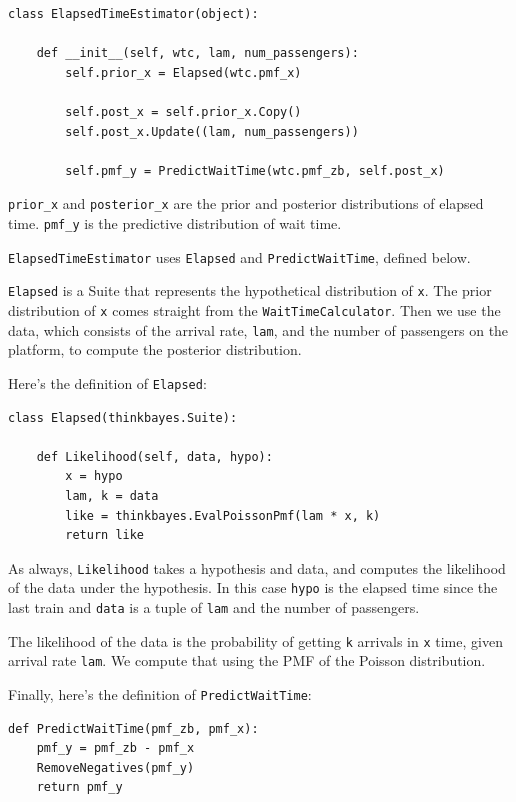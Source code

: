 \documentclass[12pt]{book}
\begin{document}
\begin{verbatim}
class ElapsedTimeEstimator(object):

    def __init__(self, wtc, lam, num_passengers):
        self.prior_x = Elapsed(wtc.pmf_x)

        self.post_x = self.prior_x.Copy()
        self.post_x.Update((lam, num_passengers))

        self.pmf_y = PredictWaitTime(wtc.pmf_zb, self.post_x)
\end{verbatim}

\verb"prior_x" and \verb"posterior_x" are the prior and
posterior distributions of elapsed time.  \verb"pmf_y" is
the predictive distribution of wait time.

{\tt ElapsedTimeEstimator} uses {\tt Elapsed} and {\tt PredictWaitTime},
defined below.

{\tt Elapsed} is a Suite that represents the hypothetical
distribution of {\tt x}.  The prior distribution of {\tt x}
comes straight from the {\tt WaitTimeCalculator}.  Then we
use the data, which consists of the arrival rate, {\tt lam},
and the number of passengers on the platform, to compute
the posterior distribution.

Here's the definition of {\tt Elapsed}:

\begin{verbatim}
class Elapsed(thinkbayes.Suite):

    def Likelihood(self, data, hypo):
        x = hypo
        lam, k = data
        like = thinkbayes.EvalPoissonPmf(lam * x, k)
        return like
\end{verbatim}

As always, {\tt Likelihood} takes a hypothesis and data, and
computes the likelihood of the data under the hypothesis.
In this case {\tt hypo} is the elapsed time since the last train
and {\tt data} is a tuple of {\tt lam} and the number of
passengers.

The likelihood of the data is the probability of getting
{\tt k} arrivals in {\tt x} time, given arrival rate
{\tt lam}.  We compute that using the PMF of the Poisson
distribution.

Finally, here's the definition of {\tt PredictWaitTime}:

\begin{verbatim}
def PredictWaitTime(pmf_zb, pmf_x):
    pmf_y = pmf_zb - pmf_x
    RemoveNegatives(pmf_y)
    return pmf_y
\end{verbatim}
\end{document}
